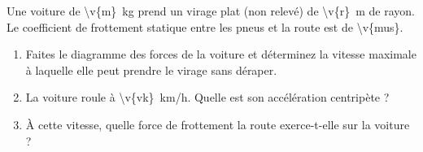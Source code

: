Une voiture de \qty{\v{m}}{kg} prend un virage plat (non relevé) de \qty{\v{r}}{m} de rayon. Le coefficient de frottement statique entre les pneus et la route est de \num{\v{mus}}.

\begin{enumerate}[label=\alph*)]
    \item Faites le diagramme des forces de la voiture et déterminez la vitesse maximale à laquelle elle peut prendre le virage sans déraper.
    \item La voiture roule à \qty{\v{vk}}{km/h}. Quelle est son accélération centripète ?
    \item À cette vitesse, quelle force de frottement la route exerce-t-elle sur la voiture ?
\end{enumerate}
